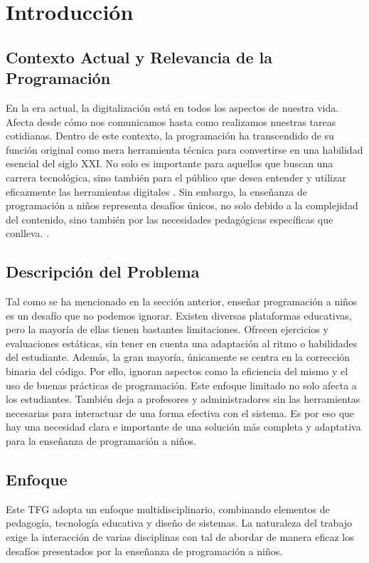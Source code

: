 \chapter{Introducción} \label{chap:introduction}

\section{Contexto Actual y Relevancia de la Programación}
En la era actual, la digitalización está en todos los aspectos de nuestra vida. Afecta desde cómo nos comunicamos hasta como realizamos nuestras tareas cotidianas. Dentro de este contexto, la programación ha transcendido de su función original como mera herramienta técnica para convertirse en una habilidad esencial del siglo XXI. No solo es importante para aquellos que buscan una carrera tecnológica, sino también para el público que desea entender y utilizar eficazmente las herramientas digitales \cite{hadi_partovi}. Sin embargo, la enseñanza de programación a niños representa desafíos únicos, no solo debido a la complejidad del contenido, sino también por las necesidades pedagógicas específicas que conlleva. \cite{liukas_tedxcern}.

\section{Descripción del Problema}

Tal como se ha mencionado en la sección anterior, enseñar programación a niños es un desafío que no podemos ignorar. Existen diversas plataformas educativas, pero la mayoría de ellas tienen bastantes limitaciones. Ofrecen ejercicios y evaluaciones estáticas, sin tener en cuenta una adaptación al ritmo o habilidades del estudiante. Además, la gran mayoría, únicamente se centra en la corrección binaria del código. Por ello, ignoran aspectos como la eficiencia del mismo y el uso de buenas prácticas de programación. Este enfoque limitado no solo afecta a los estudiantes. También deja a profesores y administradores sin las herramientas necesarias para interactuar de una forma efectiva con el sistema. Es por eso que hay una necesidad clara e importante de una solución más completa y adaptativa para la enseñanza de programación a niños.

\section{Enfoque}

Este TFG adopta un enfoque multidisciplinario, combinando elementos de pedagogía, tecnología educativa y diseño de sistemas. La naturaleza del trabajo exige la interacción de varias disciplinas con tal de abordar de manera eficaz los desafíos presentados por la enseñanza de programación a niños.

